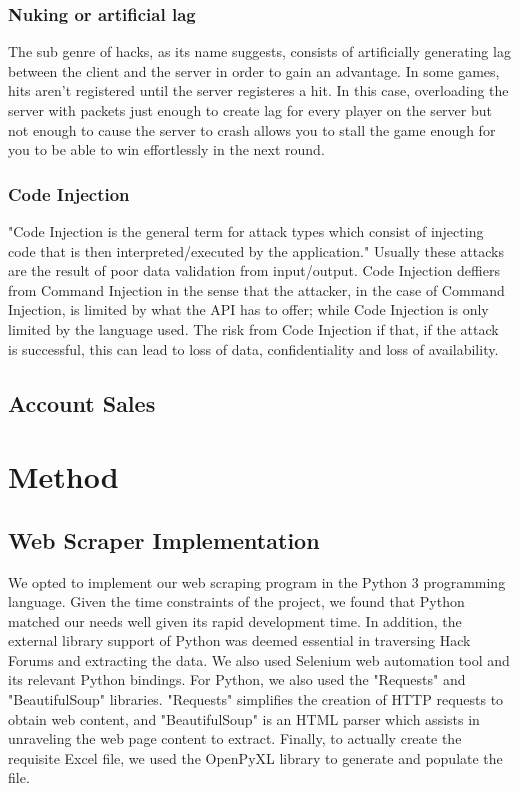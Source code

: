 \documentclass[sigconf]{acmart}
\begin{document}
\subsubsection{Nuking or artificial lag}
The sub genre of hacks, as its name suggests, consists of artificially generating lag between the 
client and the server in order to gain an advantage. In some games, hits aren't registered until 
the server registeres a hit. In this case, overloading the server with packets just enough to create lag
for every player on the server but not enough to cause the server to crash allows you to stall the game
enough for you to be able to win effortlessly in the next round.

\subsubsection{Code Injection}
"Code Injection is the general term for attack types which consist of injecting code that is then 
interpreted/executed by the application."\cite{codeinjection}
Usually these attacks are the result of poor data validation from input/output. Code Injection deffiers from
Command Injection in the sense that the attacker, in the case of Command Injection, is limited by what the API
has to offer; while Code Injection is only limited by the language used. The risk from Code Injection if that,
if the attack is successful, this can lead to loss of data, confidentiality and loss of availability.

\subsection{Account Sales}


\section{Method}

\subsection{Web Scraper Implementation}
We opted to implement our web scraping program in the Python 3 programming
language. Given the time constraints of the project, we found that Python
matched our needs well given its rapid development time. In addition, the 
external library support of Python was deemed essential in traversing
Hack Forums and extracting the data. We also used Selenium web automation tool
and its relevant Python bindings. For Python, we also used the "Requests" and 
"BeautifulSoup" libraries. "Requests" simplifies the creation of HTTP requests 
to obtain web content, and "BeautifulSoup" is an HTML parser which assists
in unraveling the web page content to extract. Finally, to actually create
the requisite Excel file, we used the OpenPyXL library to generate and
populate the file. 
\end{document}
